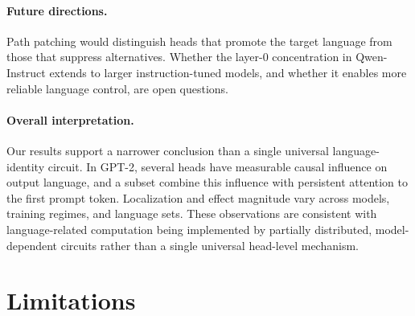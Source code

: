 \documentclass[11pt]{article}
\begin{document}
\paragraph{Future directions.} Path patching \citep{wang2022interpretability}
would distinguish heads that promote the target language from those
that suppress alternatives. Whether the layer-0 concentration in
Qwen-Instruct extends to larger instruction-tuned models, and whether
it enables more reliable language control, are open questions.

\paragraph{Overall interpretation.} Our results support a narrower conclusion
than a single universal language-identity circuit. In GPT-2, several heads
have measurable causal influence on output language, and a subset combine this
influence with persistent attention to the first prompt token. Localization and
effect magnitude vary across models, training regimes, and language sets.
These observations are consistent with language-related computation being
implemented by partially distributed, model-dependent circuits rather than a
single universal head-level mechanism.

\section{Limitations}
\label{sec:limitations}
\end{document}
